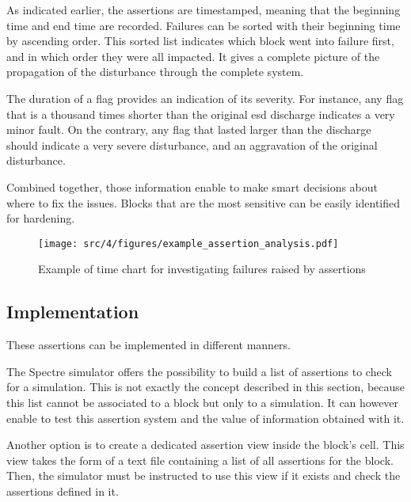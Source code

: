 As indicated earlier, the assertions are timestamped, meaning that the beginning time and end time are recorded.
Failures can be sorted with their beginning time by ascending order.
This sorted list indicates which block went into failure first, and in which order they were all impacted.
It gives a complete picture of the propagation of the disturbance through the complete system.

The duration of a flag provides an indication of its severity.
For instance, any flag that is a thousand times shorter than the original \gls{esd} discharge indicates a very minor fault.
On the contrary, any flag that lasted larger than the discharge should indicate a very severe disturbance, and an aggravation of the original disturbance.

Combined together, those information enable to make smart decisions about where to fix the issues.
Blocks that are the most sensitive can be easily identified for hardening.

\begin{figure}[!h]
  \centering
  \texttt{[image: src/4/figures/example\_assertion\_analysis.pdf]}
  \caption{Example of time chart for investigating failures raised by assertions}
  \label{fig:ex-special-cells}
\end{figure}


\subsection{Implementation}

These assertions can be implemented in different manners.

The Spectre simulator offers the possibility to build a list of assertions to check for a simulation.
This is not exactly the concept described in this section, because this list cannot be associated to a block but only to a simulation.
It can however enable to test this assertion system and the value of information obtained with it.

Another option is to create a dedicated assertion view inside the block's cell.
This view takes the form of a text file containing a list of all assertions for the block.
Then, the simulator must be instructed to use this view if it exists and check the assertions defined in it.

